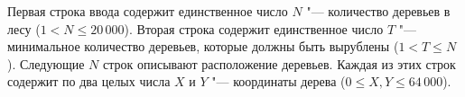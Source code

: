 Первая строка ввода содержит единственное число $N$ "--- количество
деревьев в лесу ($1 < N \le 20\,000$).
Вторая строка содержит единственное число $T$ "--- минимальное количество
деревьев, которые должны быть вырублены ($1 < T \le N$).
Следующие $N$ строк описывают расположение деревьев.
Каждая из этих строк содержит по два целых числа $X$ и $Y$ "--- координаты
дерева ($0 \leq X, Y \leq 64\,000$).

